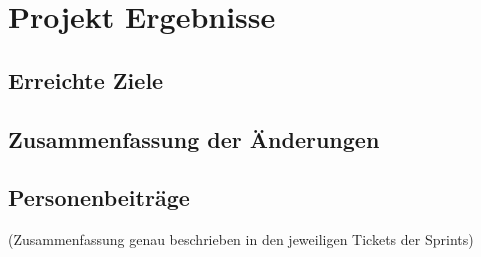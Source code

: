 
\chapter{Projekt Ergebnisse}

\section{Erreichte Ziele}

\section{Zusammenfassung der Änderungen}
\section{Personenbeiträge}
(Zusammenfassung genau beschrieben in den jeweiligen Tickets der Sprints)
